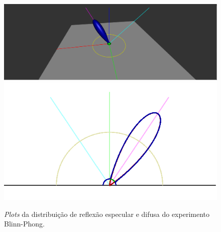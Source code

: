 \begin{figure}[H]
  
    \caption{\small{\textit{Plots} da distribuição de reflexão especular e difusa do experimento Blinn-Phong.}}
    \label{fig-blinn-phong-plots}
    \vspace{42px}
  \includegraphics[width=\linewidth]{./Imagens/brdfs/blinn-phong-3D-plot}
\endminipage\hfill
{}
  \includegraphics[width=\linewidth]{./Imagens/brdfs/blinn-phong-polar-plot-log.png}
\endminipage\hfill
\end{figure}

